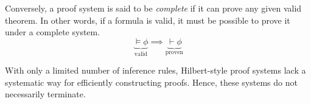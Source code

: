 Conversely, a proof system is said to be \emph{complete} if it can prove any given valid theorem. In other words, if a formula is valid, it must be possible to prove it under a complete system.
%
\begin{equation}
    \underbrace{\models \phi}_{\text{valid}} \implies \underbrace{\vdash \phi}_{\text{proven}} \tag{completeness}
\end{equation}

With only a limited number of inference rules, Hilbert-style proof systems lack a systematic way for efficiently constructing proofs. Hence, these systems do not necessarily terminate.